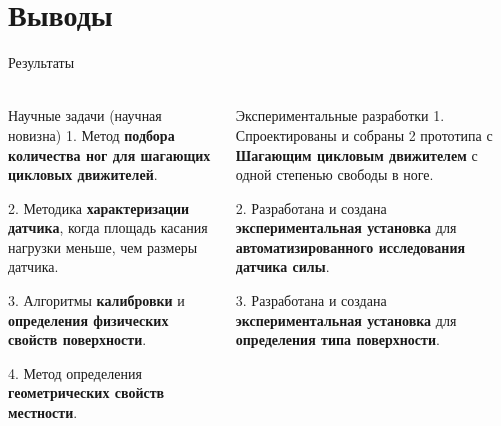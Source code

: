 \section{Выводы}

\begin{frame}[t]{Результаты}
    \framesubtitle{}
    \begin{columns}[T,onlytextwidth]
        \begin{column}{0.48\textwidth}
            \begin{exampleblock}{Научные задачи (научная новизна)}
                1. Метод \textbf{подбора количества ног для шагающих цикловых движителей}.

                2. Методика \textbf{характеризации датчика}, когда площадь касания нагрузки меньше, чем размеры датчика.

                3. Алгоритмы \textbf{калибровки} и \textbf{определения физических свойств поверхности}.

                4. Метод определения \textbf{геометрических свойств местности}.

            \end{exampleblock}
        \end{column}
        \begin{column}{0.48\textwidth}
            \begin{alertblock}{Экспериментальные разработки}
                1. Спроектированы и собраны 2 прототипа с \textbf{Шагающим цикловым движителем} с одной степенью свободы в ноге.

                2. Разработана и создана \textbf{экспериментальная установка} для \textbf{автоматизированного исследования датчика силы}.

                3. Разработана и создана \textbf{экспериментальная установка} для \textbf{определения типа поверхности}.

            \end{alertblock}
        \end{column}
    \end{columns}
\end{frame}


